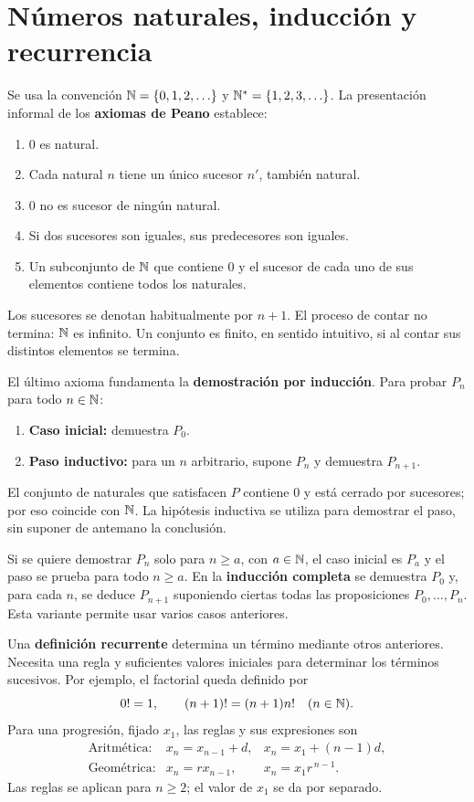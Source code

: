 \newpage
\section{Números naturales, inducción y recurrencia}
\label{sec:induccion}

Se usa la convención $\mathbb{N}=\{0,1,2,\ldots\}$ y
$\mathbb{N}^*=\{1,2,3,\ldots\}$. La presentación informal de los
\textbf{axiomas de Peano} establece:
\begin{enumerate}
 \item $0$ es natural.
 \item Cada natural $n$ tiene un único sucesor $n'$, también natural.
 \item $0$ no es sucesor de ningún natural.
 \item Si dos sucesores son iguales, sus predecesores son iguales.
 \item Un subconjunto de $\mathbb{N}$ que contiene $0$ y el sucesor de cada uno
       de sus elementos contiene todos los naturales.
\end{enumerate}
Los sucesores se denotan habitualmente por $n+1$. El proceso de contar
no termina: $\mathbb{N}$ es infinito. Un conjunto es finito, en sentido intuitivo,
si al contar sus distintos elementos se termina.

El último axioma fundamenta la \textbf{demostración por inducción}.
Para probar $P_n$ para todo $n\in\mathbb{N}$:
\begin{enumerate}
 \item \textbf{Caso inicial:} demuestra $P_0$.
 \item \textbf{Paso inductivo:} para un $n$ arbitrario, supone $P_n$
       y demuestra $P_{n+1}$.
\end{enumerate}
El conjunto de naturales que satisfacen $P$ contiene $0$ y está cerrado
por sucesores; por eso coincide con $\mathbb{N}$. La hipótesis inductiva se
utiliza para demostrar el paso, sin suponer de antemano la conclusión.

Si se quiere demostrar $P_n$ solo para $n\ge a$, con $a\in\mathbb{N}$, el caso
inicial es $P_a$ y el paso se prueba para todo $n\ge a$.
En la \textbf{inducción completa} se demuestra $P_0$ y, para cada $n$,
se deduce $P_{n+1}$ suponiendo ciertas todas las proposiciones
$P_0,\ldots,P_n$. Esta variante permite usar varios casos anteriores.

Una \textbf{definición recurrente} determina un término mediante otros
anteriores. Necesita una regla y suficientes valores iniciales para
determinar los términos sucesivos. Por ejemplo, el factorial queda
definido por
\[
 0!=1,\qquad (n+1)!=(n+1)n!\quad(n\in\mathbb{N}).
\]
Para una progresión, fijado $x_1$, las reglas y sus expresiones son
\[
 \begin{array}{lll}
 \text{Aritmética:}&x_n=x_{n-1}+d,&x_n=x_1+(n-1)d,\\[2pt]
 \text{Geométrica:}&x_n=r x_{n-1},&x_n=x_1r^{\,n-1}.
 \end{array}
\]
Las reglas se aplican para $n\ge2$; el valor de $x_1$ se da por separado.

